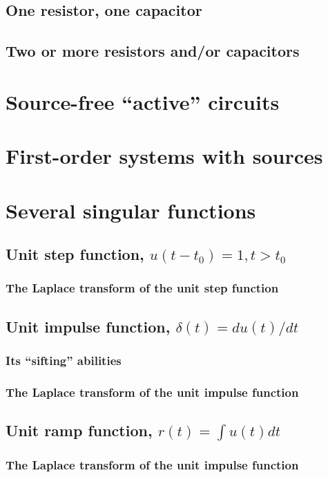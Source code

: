 \documentclass[11pt]{book}
\begin{document}
\subsection{One resistor, one capacitor}
\subsection{Two or more resistors and/or capacitors}
\section{Source-free ``active'' circuits}
\section{First-order systems with sources}
\section{Several singular functions}
\subsection{Unit step function, $u(t-t_0) = 1, t>t_0$}
\subsubsection{The Laplace transform of the unit step function}
\subsection{Unit impulse function, $\delta(t) = du(t)/dt$}
\subsubsection{Its ``sifting'' abilities}
\subsubsection{The Laplace transform of the unit impulse function}
\subsection{Unit ramp function, $r(t) = \int u(t)dt $}
\subsubsection{The Laplace transform of the unit impulse function}
\end{document}
